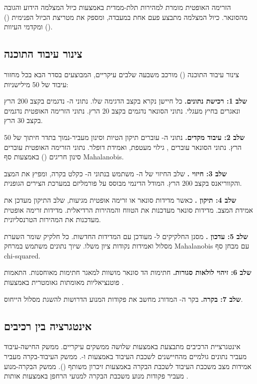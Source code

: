 הזרימה האופטית מומרת למהירות תלת-ממדית באמצעות כיול המצלמה הידוע והגובה מהסונאר. כיול המצלמה מתבצע פעם אחת במעבדה, ומספק את מטריצת הכיול הפנימית () ומקדמי העיוות ().

\subsection{צינור עיבוד התוכנה}
\label{sec:ch07_software_pipeline}

צינור עיבוד התוכנה () מורכב משבעה שלבים עיקריים, המבוצעים בסדר הבא בכל מחזור עיבוד של 50 מילישניות:

\textbf{שלב 1: רכישת נתונים.} כל חיישן נקרא בקצב הדגימה שלו. נתוני ה- נדגמים בקצב 200 הרץ ונאגרים בחיץ מעגלי. נתוני הסונאר נדגמים בקצב 20 הרץ. נתוני הזרימה האופטית נדגמים בקצב 30 הרץ.

\textbf{שלב 2: עיבוד מקדים.} נתוני ה- עוברים תיקון הטיות וסינון מעביר-נמוך בתדר חיתוך של 50 הרץ. נתוני הסונאר עוברים , גילוי מעטפת, ואמידת דופלר. נתוני הזרימה האופטית עוברים סינון חריגים () באמצעות סף Mahalanobis.

\textbf{שלב 3: חיזוי .} שלב החיזוי של ה- משתמש בנתוני ה- כקלט בקרה, ומפיץ את המצב והקווריאנס בקצב 200 הרץ. המודל הדינמי מבוסס על פורמליזם  במערכת הצירים הגופנית.

\textbf{שלב 4: תיקון .} כאשר מדידות סונאר או זרימה אופטית מגיעות, שלב התיקון מעדכן את אמידת המצב. מדידות סונאר מעדכנות את הטווח והמהירות הרדיאלית. מדידות זרימה אופטית מעדכנות את המהירות הטרנסליונית.

\textbf{שלב 5: עדכון .} מסנן החלקיקים ל- מעודכן עם המדידות החדשות. כל חלקיק שומר השערת מסלול ואמידות נקודות ציון משלו. שיוך נתונים משתמש במרחק Mahalanobis עם מבחן סף chi-squared.

\textbf{שלב 6: זיהוי לולאות סגורות.} חתימות הד סונאר מושוות למאגר חתימות מאוחסנות. התאמות פוטנציאליות מאומתות גאומטרית באמצעות .

\textbf{שלב 7: בקרה.} בקר ה- המדורג מחשב את פקודות המנוע הדרושות להשגת מסלול הייחוס.

\subsection{אינטגרציה בין רכיבים}
\label{sec:ch07_integration}

אינטגרציית הרכיבים מתבצעת באמצעות שלושה ממשקים עיקריים. ממשק החישה-עיבוד מעביר נתונים גולמיים מהחיישנים לשכבת העיבוד באמצעות  ו-. ממשק העיבוד-בקרה מעביר אמידות מצב משכבת העיבוד לשכבת הבקרה באמצעות זיכרון משותף (). ממשק הבקרה-מנוע מעביר פקודות מנוע משכבת הבקרה למנועי הרחפן באמצעות אותות .

